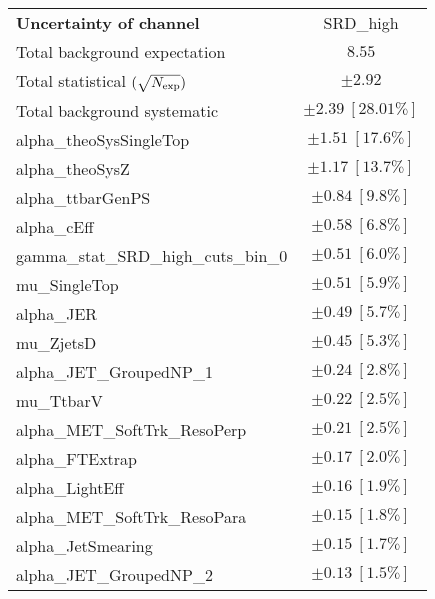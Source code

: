 
\begin{table}
\begin{center}
\setlength{\tabcolsep}{0.0pc}
\begin{tabular*}{\textwidth}{@{\extracolsep{\fill}}lc}
\noalign{\smallskip}\hline\noalign{\smallskip}
{\bf Uncertainty of channel}                                    & SRD\_high            \\
\noalign{\smallskip}\hline\noalign{\smallskip}
Total background expectation             &  $8.55$       \\
\noalign{\smallskip}\hline\noalign{\smallskip}
Total statistical $(\sqrt{N_{\rm exp}})$              & $\pm 2.92$       \\
Total background systematic               & $\pm 2.39\ [28.01\%] $             \\
\noalign{\smallskip}\hline\noalign{\smallskip}
\noalign{\smallskip}\hline\noalign{\smallskip}
alpha\_theoSysSingleTop         & $\pm 1.51\ [17.6\%] $       \\
alpha\_theoSysZ         & $\pm 1.17\ [13.7\%] $       \\
alpha\_ttbarGenPS         & $\pm 0.84\ [9.8\%] $       \\
alpha\_cEff         & $\pm 0.58\ [6.8\%] $       \\
gamma\_stat\_SRD\_high\_cuts\_bin\_0         & $\pm 0.51\ [6.0\%] $       \\
mu\_SingleTop         & $\pm 0.51\ [5.9\%] $       \\
alpha\_JER         & $\pm 0.49\ [5.7\%] $       \\
mu\_ZjetsD         & $\pm 0.45\ [5.3\%] $       \\
alpha\_JET\_GroupedNP\_1         & $\pm 0.24\ [2.8\%] $       \\
mu\_TtbarV         & $\pm 0.22\ [2.5\%] $       \\
alpha\_MET\_SoftTrk\_ResoPerp         & $\pm 0.21\ [2.5\%] $       \\
alpha\_FTExtrap         & $\pm 0.17\ [2.0\%] $       \\
alpha\_LightEff         & $\pm 0.16\ [1.9\%] $       \\
alpha\_MET\_SoftTrk\_ResoPara         & $\pm 0.15\ [1.8\%] $       \\
alpha\_JetSmearing         & $\pm 0.15\ [1.7\%] $       \\
alpha\_JET\_GroupedNP\_2         & $\pm 0.13\ [1.5\%] $       \\

\end{tabular*}
\end{center}
\end{table}
